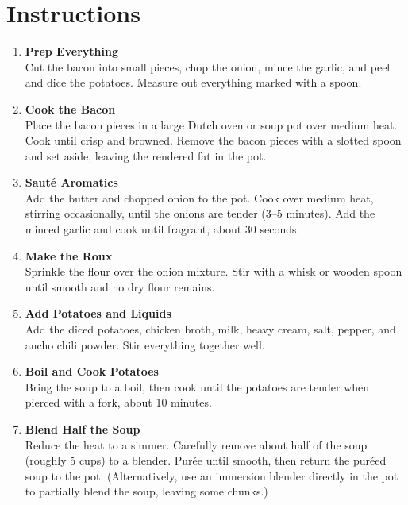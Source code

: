 \newpage
{}
\section*{Instructions}

\begin{enumerate}

      \item \textbf{Prep Everything} \\
            Cut the bacon into small pieces, chop the onion, mince the garlic, and peel and dice the potatoes. Measure out everything marked with a spoon.

      \item \textbf{Cook the Bacon} \\
            Place the bacon pieces in a large Dutch oven or soup pot over medium heat. Cook until crisp and browned. Remove the bacon pieces with a slotted spoon and set aside, leaving the rendered fat in the pot.

      \item \textbf{Sauté Aromatics} \\
            Add the butter and chopped onion to the pot. Cook over medium heat, stirring occasionally, until the onions are tender (3--5 minutes). Add the minced garlic and cook until fragrant, about 30 seconds.

      \item \textbf{Make the Roux} \\
            Sprinkle the flour over the onion mixture. Stir with a whisk or wooden spoon until smooth and no dry flour remains.

      \item \textbf{Add Potatoes and Liquids} \\
            Add the diced potatoes, chicken broth, milk, heavy cream, salt, pepper, and ancho chili powder. Stir everything together well.

      \item \textbf{Boil and Cook Potatoes} \\
            Bring the soup to a boil, then cook until the potatoes are tender when pierced with a fork, about 10 minutes.

      \item \textbf{Blend Half the Soup} \\
            Reduce the heat to a simmer. Carefully remove about half of the soup (roughly 5 cups) to a blender. Purée until smooth, then return the puréed soup to the pot. (Alternatively, use an immersion blender directly in the pot to partially blend the soup, leaving some chunks.)


\end{enumerate}
